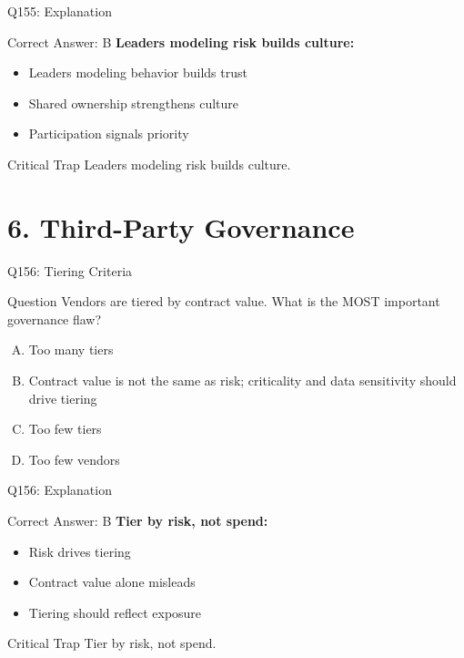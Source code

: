 \documentclass{beamer}
\begin{document}
	\begin{frame}{Q155: Explanation}
		\begin{block}{Correct Answer: B}
			\textbf{Leaders modeling risk builds culture:}
			\begin{itemize}
				\item Leaders modeling behavior builds trust
				\item Shared ownership strengthens culture
				\item Participation signals priority
			\end{itemize}
		\end{block}
		\begin{alertblock}{Critical Trap}
			Leaders modeling risk builds culture.
		\end{alertblock}
	\end{frame}
	
	\section{6. Third-Party Governance}
	
	\begin{frame}{Q156: Tiering Criteria}
		\begin{block}{Question}
			Vendors are tiered by contract value. What is the MOST important governance flaw?
		\end{block}
		\begin{enumerate}[(A)]
			\item Too many tiers
			\item Contract value is not the same as risk; criticality and data sensitivity should drive tiering
			\item Too few tiers
			\item Too few vendors
		\end{enumerate}
	\end{frame}
	
	\begin{frame}{Q156: Explanation}
		\begin{block}{Correct Answer: B}
			\textbf{Tier by risk, not spend:}
			\begin{itemize}
				\item Risk drives tiering
				\item Contract value alone misleads
				\item Tiering should reflect exposure
			\end{itemize}
		\end{block}
		\begin{alertblock}{Critical Trap}
			Tier by risk, not spend.
		\end{alertblock}
	\end{frame}
	
\end{document}
